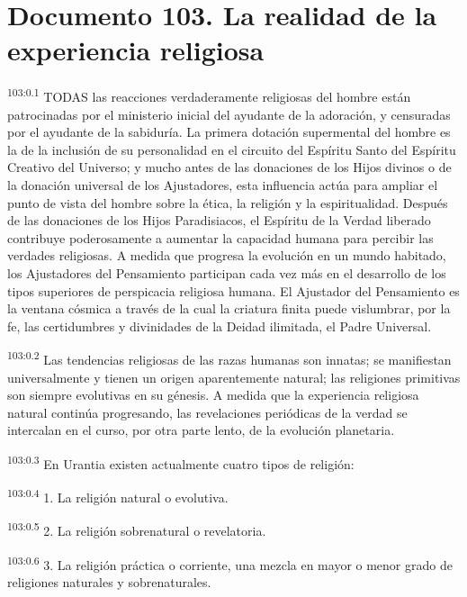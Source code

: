\chapter{Documento 103. La realidad de la experiencia religiosa}
\par
\textsuperscript{103:0.1} TODAS las reacciones verdaderamente religiosas del hombre están patrocinadas por el ministerio inicial del ayudante de la adoración, y censuradas por el ayudante de la sabiduría. La primera dotación supermental del hombre es la de la inclusión de su personalidad en el circuito del Espíritu Santo del Espíritu Creativo del Universo; y mucho antes de las donaciones de los Hijos divinos o de la donación universal de los Ajustadores, esta influencia actúa para ampliar el punto de vista del hombre sobre la ética, la religión y la espiritualidad. Después de las donaciones de los Hijos Paradisiacos, el Espíritu de la Verdad liberado contribuye poderosamente a aumentar la capacidad humana para percibir las verdades religiosas. A medida que progresa la evolución en un mundo habitado, los Ajustadores del Pensamiento participan cada vez más en el desarrollo de los tipos superiores de perspicacia religiosa humana. El Ajustador del Pensamiento es la ventana cósmica a través de la cual la criatura finita puede vislumbrar, por la fe, las certidumbres y divinidades de la Deidad ilimitada, el Padre Universal.

\par
\textsuperscript{103:0.2} Las tendencias religiosas de las razas humanas son innatas; se manifiestan universalmente y tienen un origen aparentemente natural; las religiones primitivas son siempre evolutivas en su génesis. A medida que la experiencia religiosa natural continúa progresando, las revelaciones periódicas de la verdad se intercalan en el curso, por otra parte lento, de la evolución planetaria.

\par
\textsuperscript{103:0.3} En Urantia existen actualmente cuatro tipos de religión:

\par
\textsuperscript{103:0.4} 1. La religión natural o evolutiva.

\par
\textsuperscript{103:0.5} 2. La religión sobrenatural o revelatoria.

\par
\textsuperscript{103:0.6} 3. La religión práctica o corriente, una mezcla en mayor o menor grado de religiones naturales y sobrenaturales.

